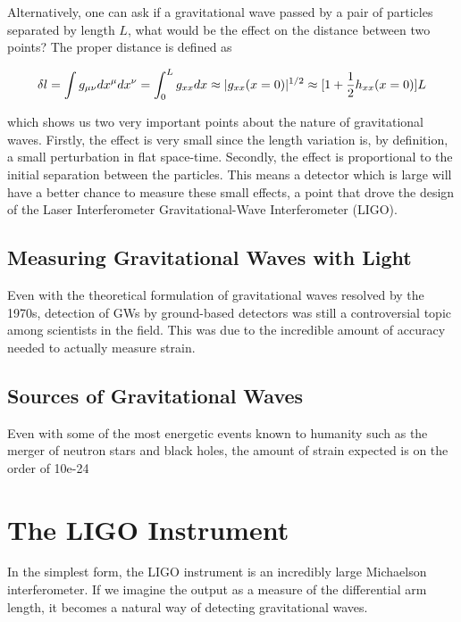 \documentclass[oneside]{book}
\begin{document}
	Alternatively, one can ask if a gravitational wave passed by a pair of particles separated by length $L$, what would be the effect on the distance between two points?  The proper distance is defined as

	\begin{equation}\label{propdist}
	\delta l
	= \int{g_{\mu \nu} dx^{\mu} dx^{\nu}} \\
	= \int_{0}^{L}{g_{xx} {d}x}\\
	\approx |g_{xx}(x=0)|^{1/2}\\
	\approx [ 1 + \frac{1}{2} h_{xx}(x=0)] L
	\end{equation} 
	
	which shows us two very important points about the nature of gravitational waves.  Firstly, the effect is very small since the length variation is, by definition, a small perturbation in flat space-time.  Secondly, the effect is proportional to the initial separation between the particles. This means a detector which is large will have a better chance to measure these small effects, a point that drove the design of the Laser Interferometer Gravitational-Wave Interferometer (LIGO).
	
	\subsection{Measuring Gravitational Waves with Light}
	Even with the theoretical formulation of gravitational waves resolved by the 1970s, detection of GWs by ground-based detectors was still a controversial topic among scientists in the field.  This was due to the incredible amount of accuracy needed to actually measure strain. 
	
	
	\subsection{Sources of Gravitational Waves}
	Even with some of the most energetic events known to humanity such as the merger of neutron stars and black holes, the amount of strain expected is on the order of 10e-24
	
	\cite{Saulson}
	
	
	\section{The LIGO Instrument}
	In the simplest form, the LIGO instrument is an incredibly large Michaelson interferometer.  If we imagine the output as a measure of the differential arm length, it becomes a natural way of detecting gravitational waves.
	
\end{document}
